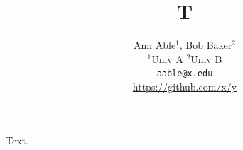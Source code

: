 \documentclass{article}
\title{T}
\author{Ann Able$^{1}$, Bob Baker$^{2}$ \\ $^{1}$Univ A \quad $^{2}$Univ B \\ \texttt{aable@x.edu} \\ \icon \quad \url{https://github.com/x/y}}
\begin{document}
\maketitle
Text.
\end{document}
